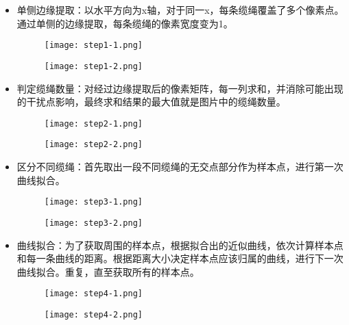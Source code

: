 \documentclass{article}
\begin{document}
\begin{itemize}
\item
  单侧边缘提取：以水平方向为x轴，对于同一x，每条缆绳覆盖了多个像素点。通过单侧的边缘提取，每条缆绳的像素宽度变为1。\\
  \begin{figure}[H]
  \begin{minipage}{0.5\linewidth}
  \centerline{\texttt{[image: step1-1.png]}}
  \end{minipage}
  \hfill
  \begin{minipage}{0.5\linewidth}
  \centerline{\texttt{[image: step1-2.png]}}
  \end{minipage}
  \end{figure}

\item
  判定缆绳数量：对经过边缘提取后的像素矩阵，每一列求和，并消除可能出现的干扰点影响，最终求和结果的最大值就是图片中的缆绳数量。\\
  \begin{figure}[H]
  \begin{minipage}{0.5\linewidth}
  \centerline{\texttt{[image: step2-1.png]}}
  \end{minipage}
  \hfill
  \begin{minipage}{0.5\linewidth}
  \centerline{\texttt{[image: step2-2.png]}}
  \end{minipage}
  \end{figure}

\item
  区分不同缆绳：首先取出一段不同缆绳的无交点部分作为样本点，进行第一次曲线拟合。\\
  \begin{figure}[H]
  \begin{minipage}{0.5\linewidth}
  \centerline{\texttt{[image: step3-1.png]}}
  \end{minipage}
  \hfill
  \begin{minipage}{0.5\linewidth}
  \centerline{\texttt{[image: step3-2.png]}}
  \end{minipage}
  \end{figure}

\item
  曲线拟合：为了获取周围的样本点，根据拟合出的近似曲线，依次计算样本点和每一条曲线的距离。根据距离大小决定样本点应该归属的曲线，进行下一次曲线拟合。重复，直至获取所有的样本点。\\
  \begin{figure}[H]
  \begin{minipage}{0.5\linewidth}
  \centerline{\texttt{[image: step4-1.png]}}
  \end{minipage}
  \hfill
  \begin{minipage}{0.5\linewidth}
  \centerline{\texttt{[image: step4-2.png]}}
  \end{minipage}
  \end{figure}


\end{itemize}
\end{document}
